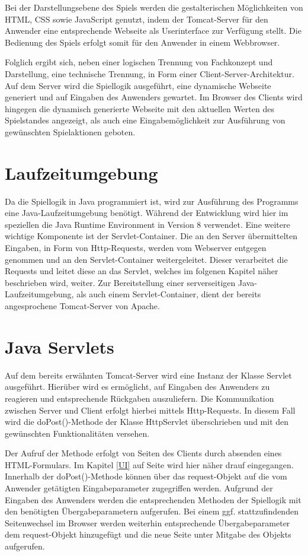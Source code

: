 Bei der Darstellungsebene des Spiels werden die gestalterischen Möglichkeiten von HTML, CSS sowie JavaScript genutzt, indem der Tomcat-Server für den Anwender eine entsprechende Webseite als Userinterface zur Verfügung stellt. Die Bedienung des Spiels erfolgt somit für den Anwender in einem Webbrowser.

Folglich ergibt sich, neben einer logischen Trennung von Fachkonzept und Darstellung, eine technische Trennung, in Form einer Client-Server-Architektur. Auf dem Server wird die Spiellogik ausgeführt, eine dynamische Webseite generiert und auf Eingaben des Anwenders gewartet. Im Browser des Clients wird hingegen die dynamisch generierte Webseite mit den aktuellen Werten des Spielstandes angezeigt, als auch eine Eingabemöglichkeit zur Ausführung von gewünschten Spielaktionen geboten.

\section{Laufzeitumgebung}
Da die Spiellogik in Java programmiert ist, wird zur Ausführung des Programms eine Java-Laufzeitumgebung benötigt. Während der Entwicklung wird hier im speziellen die Java Runtime Environment in Version 8 verwendet. Eine weitere wichtige Komponente ist der Servlet-Container. Die an den Server übermittelten Eingaben, in Form von Http-Requests, werden vom Webserver entgegen genommen und an den Servlet-Container weitergeleitet. Dieser verarbeitet die Requests und leitet diese an das Servlet, welches im folgenen Kapitel näher beschrieben wird, weiter. Zur Bereitstellung einer serverseitigen Java-Laufzeitumgebung, als auch einem Servlet-Container, dient der bereits angesprochene Tomcat-Server von Apache.

\section{Java Servlets}\label{sec:Servlets}
Auf dem bereits erwähnten Tomcat-Server wird eine Instanz der Klasse Servlet ausgeführt. Hierüber wird es ermöglicht, auf Eingaben des Anwenders zu reagieren und entsprechende Rückgaben auszuliefern. Die Kommunikation zwischen Server und Client erfolgt hierbei mittels Http-Requests. In diesem Fall wird die doPost()-Methode der Klasse HttpServlet überschrieben und mit den gewünschten Funktionalitäten versehen.

Der Aufruf der Methode erfolgt von Seiten des Clients durch absenden eines HTML-Formulars. Im Kapitel \ref{UI} auf Seite \pageref{UI} wird hier näher drauf eingegangen. Innerhalb der doPost()-Methode können über das request-Objekt auf die vom Anwender getätigten Eingabeparameter zugegriffen werden. Aufgrund der Eingaben des Anwenders werden die entsprechenden Methoden der Spiellogik mit den benötigten Übergabeparametern aufgerufen. Bei einem ggf. stattzufindenden Seitenwechsel im Browser werden weiterhin entsprechende Übergabeparameter dem request-Objekt hinzugefügt und die neue Seite unter Mitgabe des Objekts aufgerufen.

